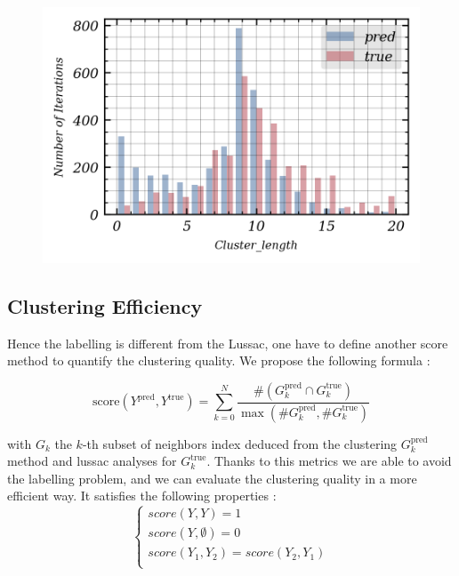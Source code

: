 \documentclass[11pt,a4paper]{report}
\begin{document}
\begin{multicols}{2}
    \begin{figure}[H]
        \includegraphics[scale = 1]{./figure/cluster_length.png}
        \vspace{0.15cm}
    \end{figure}


    \subsection{Clustering Efficiency}  Hence the labelling is different from the Lussac, one have
    to define another score method to quantify the clustering quality. We propose the following formula :

    $$ \text{score}(Y^{\text{pred}}, Y^{\text{true}}) = \sum_{k=0}^N \frac{ \# (G_k^{\text{pred}} \cap  G_k^{\text{true}})}{\max (\# G_k^{\text{pred}}, \# G_k^{\text{true}})}$$

    with $G_k$ the $k$-th subset of neighbors index deduced from the clustering $G_k^{\text{pred}}$ method and lussac analyses for $G_k^{\text{true}}$. Thanks to this metrics we are able to avoid the labelling problem,
    and we can evaluate the clustering quality in a more efficient way. It satisfies the following properties :
    $$\begin{cases}
            score(Y,Y) = 1                     \\
            score(Y, \emptyset) = 0            \\
            score(Y_1, Y_2) =  score(Y_2, Y_1) \\
        \end{cases}$$


\end{multicols}
\end{document}
